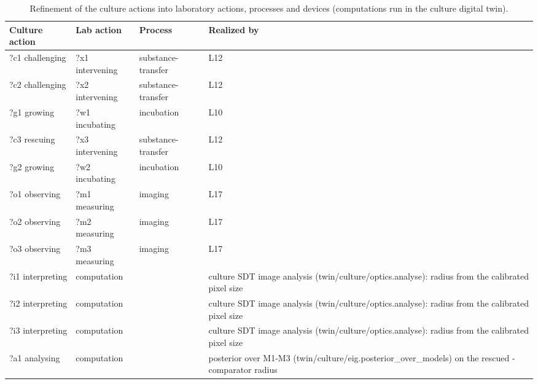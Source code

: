 \documentclass[10pt,a4paper]{article}
\begin{document}
\begin{table}[tbp]\centering\small
\caption{Refinement of the culture actions into laboratory actions, processes and devices (computations run in the culture digital twin).}\label{tab:refine}
\begin{tabularx}{\linewidth}{lllX}\toprule
\textbf{Culture action} & \textbf{Lab action} & \textbf{Process} & \textbf{Realized by} \\\midrule
?c1 challenging & ?x1 intervening & substance-transfer & L12 \\
?c2 challenging & ?x2 intervening & substance-transfer & L12 \\
?g1 growing & ?w1 incubating & incubation & L10 \\
?c3 rescuing & ?x3 intervening & substance-transfer & L12 \\
?g2 growing & ?w2 incubating & incubation & L10 \\
?o1 observing & ?m1 measuring & imaging & L17 \\
?o2 observing & ?m2 measuring & imaging & L17 \\
?o3 observing & ?m3 measuring & imaging & L17 \\
?i1 interpreting &  computation &  & culture SDT image analysis (twin/culture/optics.analyse): radius from the calibrated pixel size \\
?i2 interpreting &  computation &  & culture SDT image analysis (twin/culture/optics.analyse): radius from the calibrated pixel size \\
?i3 interpreting &  computation &  & culture SDT image analysis (twin/culture/optics.analyse): radius from the calibrated pixel size \\
?a1 analysing &  computation &  & posterior over M1-M3 (twin/culture/eig.posterior\_over\_models) on the rescued - comparator radius \\\bottomrule
\end{tabularx}
\end{table}
\end{document}
